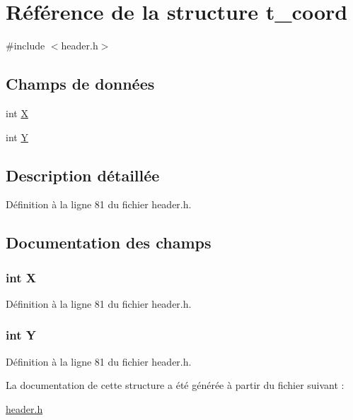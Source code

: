 \hypertarget{structt__coord}{\section{Référence de la structure t\-\_\-coord}
\label{structt__coord}
}


{\ttfamily \#include $<$header.\-h$>$}

\subsection*{Champs de données}
\begin{DoxyCompactItemize}
\item 
int \hyperlink{structt__coord_a80c0944640e62d3ed6c5419c1bcc0c88}{X}
\item 
int \hyperlink{structt__coord_aa482c4cc86a24474e4fb19b5b5978778}{Y}
\end{DoxyCompactItemize}


\subsection{Description détaillée}


Définition à la ligne 81 du fichier header.\-h.



\subsection{Documentation des champs}
\hypertarget{structt__coord_a80c0944640e62d3ed6c5419c1bcc0c88}{
\subsubsection[{X}]{\setlength{\rightskip}{0pt plus 5cm}int X}}\label{structt__coord_a80c0944640e62d3ed6c5419c1bcc0c88}


Définition à la ligne 81 du fichier header.\-h.

\hypertarget{structt__coord_aa482c4cc86a24474e4fb19b5b5978778}{
\subsubsection[{Y}]{\setlength{\rightskip}{0pt plus 5cm}int Y}}\label{structt__coord_aa482c4cc86a24474e4fb19b5b5978778}


Définition à la ligne 81 du fichier header.\-h.



La documentation de cette structure a été générée à partir du fichier suivant \-:\begin{DoxyCompactItemize}
\item 
\hyperlink{header_8h}{header.\-h}\end{DoxyCompactItemize}
